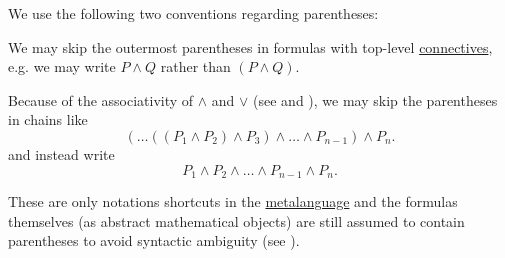 \begin{remark}\label{rem:propositional_formula_parentheses}
  We use the following two conventions regarding parentheses:
  \begin{thmenum}
     We may skip the outermost parentheses in formulas with top-level \hyperref[def:propositional_language/connectives]{connectives}, e.g. we may write \( P \wedge Q \) rather than \( (P \wedge Q) \).

     Because of the associativity of \( \wedge \) and \( \vee \) (see  and ), we may skip the parentheses in chains like
    \begin{equation*}
      ( \ldots ((P_1 \wedge P_2) \wedge P_3) \wedge \ldots \wedge P_{n-1} ) \wedge P_n.
    \end{equation*}
    and instead write
    \begin{equation*}
      P_1 \wedge P_2 \wedge \ldots \wedge P_{n-1} \wedge P_n.
    \end{equation*}
  \end{thmenum}

  These are only notations shortcuts in the \hyperref[rem:metalanguage_syntax_and_semantics]{metalanguage} and the formulas themselves (as abstract mathematical objects) are still assumed to contain parentheses to avoid syntactic ambiguity (see ).
\end{remark}

